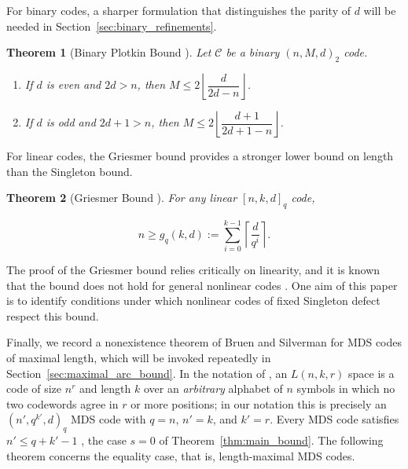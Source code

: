 \documentclass[12pt, letterpaper]{article}
\theoremstyle{plain}
\newtheorem{theorem}{Theorem}[section]
\theoremstyle{definition}
\begin{document}
	For binary codes, a sharper formulation that distinguishes the parity of $d$ will be needed in Section~\ref{sec:binary_refinements}.
	
	\begin{theorem}[Binary Plotkin Bound
		\cite{Plotkin1960, MacWilliamsSloane1977}]
		\label{thm:plotkin_binary}
		Let $\mathcal{C}$ be a binary $(n, M, d)_2$ code.
		\begin{enumerate}
			\item If $d$ is even and $2d > n$, then $M \le 2\left\lfloor \dfrac{d}{2d-n} \right\rfloor$.
			\item If $d$ is odd and $2d+1 > n$, then $M \le 2\left\lfloor \dfrac{d+1}{2d+1-n} \right\rfloor$.
		\end{enumerate}
	\end{theorem}
	
	For linear codes, the Griesmer bound provides a stronger lower bound on length than the Singleton bound.
	
	\begin{theorem}[Griesmer Bound \cite{Griesmer1960, SS65}]
		\label{thm:griesmer}
		For any linear $[n, k, d]_q$ code,

		\begin{equation} \label{eqn:GriesmerBound}
			n \ge g_q(k,d) := \sum_{i=0}^{k-1} \left\lceil \frac{d}{q^i} \right\rceil.
		\end{equation}

	\end{theorem}

	The proof of the Griesmer bound relies critically on linearity, and it is known that the bound does not hold for general nonlinear codes \cite{Bellini2015Griesmer}. One aim of this paper is to identify conditions under which nonlinear codes of fixed Singleton defect respect this bound.

	Finally, we record a nonexistence theorem of Bruen and Silverman for MDS codes of maximal length, which will be invoked repeatedly in
	Section~\ref{sec:maximal_arc_bound}. In the notation of \cite{BruenSilverman1983}, an $L(n,k,r)$ space is a code of size $n^r$ and 	length $k$ over an \emph{arbitrary} alphabet of $n$ symbols in which no two codewords agree in $r$ or more positions; in our notation this is precisely an $(n', q^{k'}, d)_q$ MDS code with $q = n$, $n' = k$, and $k' = r$.  Every MDS code satisfies $n' \le q + k' - 1$ 	\cite[Lemma~5]{SilvermanMetrization1960}, the case $s=0$ of Theorem~\ref{thm:main_bound}. The following theorem concerns the equality case, that is, length-maximal MDS codes.
\end{document}

